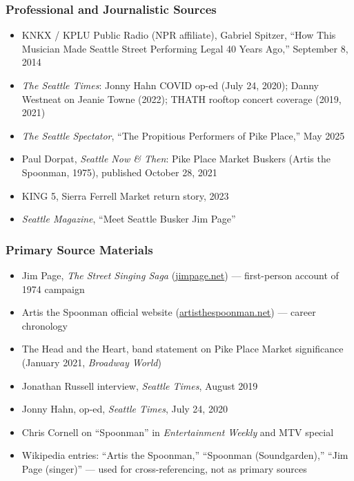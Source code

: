 \documentclass[11pt,letterpaper]{article}
\begin{document}
\subsubsection{Professional and Journalistic Sources}

\begin{itemize}[leftmargin=1.5em]
  \item KNKX / KPLU Public Radio (NPR affiliate), Gabriel Spitzer, ``How This Musician Made Seattle Street Performing Legal 40 Years Ago,'' September 8, 2014
  \item \textit{The Seattle Times}: Jonny Hahn COVID op-ed (July 24, 2020); Danny Westneat on Jeanie Towne (2022); THATH rooftop concert coverage (2019, 2021)
  \item \textit{The Seattle Spectator}, ``The Propitious Performers of Pike Place,'' May 2025
  \item Paul Dorpat, \textit{Seattle Now \& Then}: Pike Place Market Buskers (Artis the Spoonman, 1975), published October 28, 2021
  \item KING 5, Sierra Ferrell Market return story, 2023
  \item \textit{Seattle Magazine}, ``Meet Seattle Busker Jim Page''
\end{itemize}

\subsubsection{Primary Source Materials}

\begin{itemize}[leftmargin=1.5em]
  \item Jim Page, \textit{The Street Singing Saga} (\url{jimpage.net}) --- first-person account of 1974 campaign
  \item Artis the Spoonman official website (\url{artisthespoonman.net}) --- career chronology
  \item The Head and the Heart, band statement on Pike Place Market significance (January 2021, \textit{Broadway World})
  \item Jonathan Russell interview, \textit{Seattle Times}, August 2019
  \item Jonny Hahn, op-ed, \textit{Seattle Times}, July 24, 2020
  \item Chris Cornell on ``Spoonman'' in \textit{Entertainment Weekly} and MTV special
  \item Wikipedia entries: ``Artis the Spoonman,'' ``Spoonman (Soundgarden),'' ``Jim Page (singer)'' --- used for cross-referencing, not as primary sources
\end{itemize}
\end{document}
